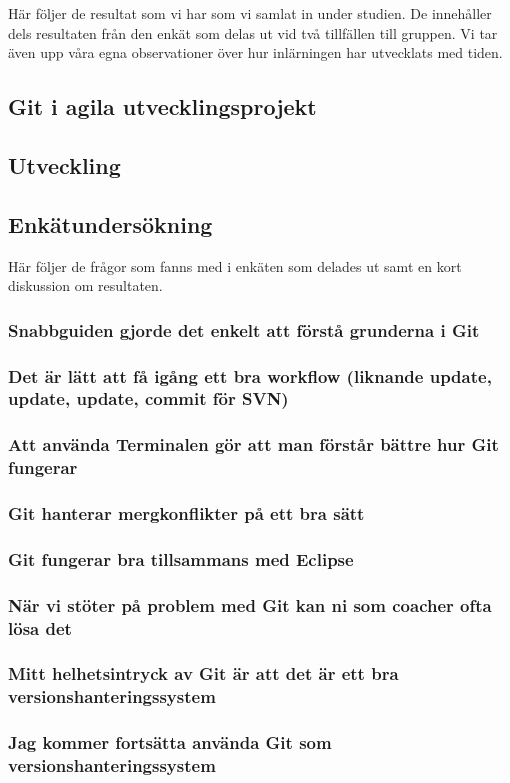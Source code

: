 Här följer de resultat som vi har som vi samlat in under studien. De innehåller dels resultaten från den enkät som delas ut vid två tillfällen till gruppen. Vi tar även upp våra egna observationer över hur inlärningen har utvecklats med tiden. 

\subsection{Git i agila utvecklingsprojekt}
\subsection{Utveckling}
\subsection{Enkätundersökning}
Här följer de frågor som fanns med i enkäten som delades ut samt en kort diskussion om resultaten.

\subsubsection{Snabbguiden gjorde det enkelt att förstå grunderna i Git}

\subsubsection{Det är lätt att få igång ett bra workflow (liknande update, update, update, commit för SVN)}


\subsubsection{Att använda Terminalen gör att man förstår bättre hur Git fungerar}


\subsubsection{Git hanterar mergkonflikter på ett bra sätt}


\subsubsection{Git fungerar bra tillsammans med Eclipse}


\subsubsection{När vi stöter på problem med Git kan ni som coacher ofta lösa det}


\subsubsection{Mitt helhetsintryck av Git är att det är ett bra versionshanteringssystem}


\subsubsection{Jag kommer fortsätta använda Git som versionshanteringssystem}
